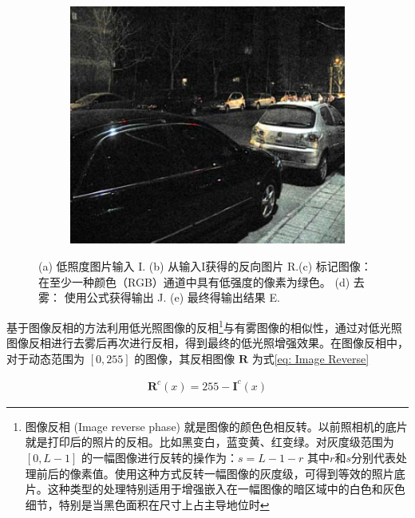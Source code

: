 \documentclass[a4paper]{ctexart}
\begin{document}
\begin{figure}[htbp]
\begin{subfigure}{0.18\textwidth}
			\captionsetup{font=scriptsize}
			\label{fig: de-haze}
		\end{subfigure}
		\begin{subfigure}{0.18\textwidth}
			\includegraphics[width=\linewidth]{picture/LLIE/Inverse/Final output}
			\captionsetup{font=scriptsize}
			\label{fig: Final output}
		\end{subfigure}
		\caption{
			\label{fig: Image Inverse}
			(a) 低照度图片输入 I. (b) 从输入I获得的反向图片 R.(c) 标记图像：在至少一种颜色（RGB）通道中具有低强度的像素为绿色。 (d) 去雾： 使用公式获得输出 J. (e) 最终得输出结果 E.
		}
	\end{figure}
	
	基于图像反相的方法\cite{dong2010fast}利用低光照图像的反相\footnote{图像反相 (Image reverse phase) 就是图像的颜色色相反转。以前照相机的底片就是打印后的照片的反相。比如黑变白，蓝变黄、红变绿。对灰度级范围为 $[0 , L-1]$ 的一幅图像进行反转的操作为：$s = L - 1 - r$ 其中$r$和$s$分别代表处理前后的像素值。使用这种方式反转一幅图像的灰度级，可得到等效的照片底片。这种类型的处理特别适用于增强嵌入在一幅图像的暗区域中的白色和灰色细节，特别是当黑色面积在尺寸上占主导地位时}与有雾图像的相似性，通过对低光照图像反相进行去雾后再次进行反相，得到最终的低光照增强效果。在图像反相中，对于动态范围为 $[ 0, 255]$ 的图像，其反相图像 $\mathbf{R}$ 为式\ref{eq: Image Reverse} 
	
	\begin{equation}
		\begin{aligned}
			\mathbf{R}^c (x) = 255 - \mathbf{I}^c(x)
		\end{aligned}
		\label{eq: Image Reverse}
	\end{equation}
	
\end{document}

